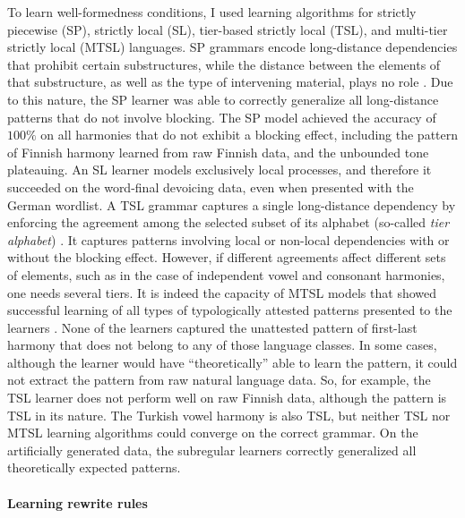 To learn well-formedness conditions, I used learning algorithms for strictly piecewise (SP), strictly local (SL), tier-based strictly local (TSL), and multi-tier strictly local (MTSL) languages.
SP grammars encode long-distance dependencies that prohibit certain substructures, while the distance between the elements of that substructure, as well as the type of intervening material, plays no role \cite{HeinzRogers2010SPdist,Heinz-2010-SEL}.
Due to this nature, the SP learner was able to correctly generalize all long-distance patterns that do not involve blocking.
The SP model achieved the accuracy of $100\%$ on all harmonies that do not exhibit a blocking effect, including the pattern of Finnish harmony learned from raw Finnish data, and the unbounded tone plateauing.
An SL learner models exclusively local processes, and therefore it succeeded on the word-final devoicing data, even when presented with the German wordlist.
A TSL grammar captures a single long-distance dependency by enforcing the agreement among the selected subset of its alphabet (so-called \emph{tier alphabet}) \citep{HeinzRawal11,JardineMcMullin2017}.
It captures patterns involving local or non-local dependencies with or without the blocking effect.
However, if different agreements affect different sets of elements, such as in the case of independent vowel and consonant harmonies, one needs several tiers.
It is indeed the capacity of MTSL models that showed successful learning of all types of typologically attested patterns presented to the learners \citep{DeSantoGraf19FG,McMullinAksenovaDeSanto2019}.
None of the learners captured the unattested pattern of first-last harmony that does not belong to any of those language classes.
In some cases, although the learner would have ``theoretically'' able to learn the pattern, it could not extract the pattern from raw natural language data.
So, for example, the TSL learner does not perform well on raw Finnish data, although the pattern is TSL in its nature.
The Turkish vowel harmony is also TSL, but neither TSL nor MTSL learning algorithms could converge on the correct grammar.
On the artificially generated data, the subregular learners correctly generalized all theoretically expected patterns.





\paragraph{Learning rewrite rules}

